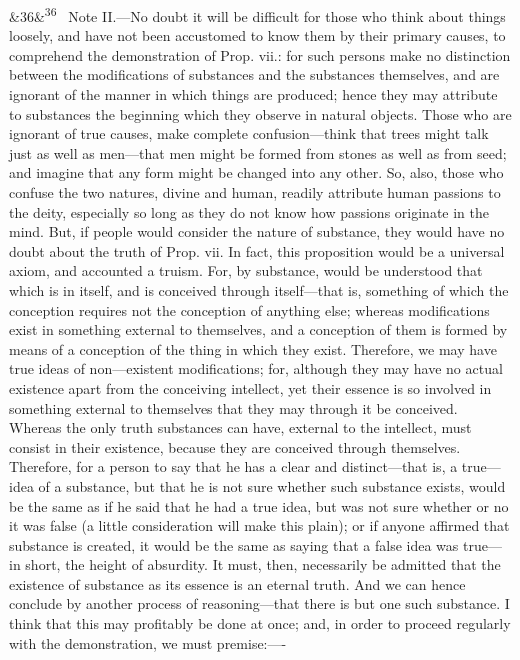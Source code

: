\documentclass[12pt]{article}
\newcommand{\para}[1][]{\par\noindent\ifx&#1&\else\textsuperscript{\footnotesize #1}~\fi}
\begin{document}
\para[36] Note II.---No doubt it will be difficult for those who think about things loosely, and have not been accustomed to know them by their primary causes, to comprehend the demonstration of Prop. vii.: for such persons make no distinction between the modifications of substances and the substances themselves, and are ignorant of the manner in which things are produced; hence they may attribute to substances the beginning which they observe in natural objects. Those who are ignorant of true causes, make complete confusion---think that trees might talk just as well as men---that men might be formed from stones as well as from seed; and imagine that any form might be changed into any other. So, also, those who confuse the two natures, divine and human, readily attribute human passions to the deity, especially so long as they do not know how passions originate in the mind. But, if people would consider the nature of substance, they would have no doubt about the truth of Prop. vii. In fact, this proposition would be a universal axiom, and accounted a truism. For, by substance, would be understood that which is in itself, and is conceived through itself---that is, something of which the conception requires not the conception of anything else; whereas modifications exist in something external to themselves, and a conception of them is formed by means of a conception of the thing in which they exist. Therefore, we may have true ideas of non---existent modifications; for, although they may have no actual existence apart from the conceiving intellect, yet their essence is so involved in something external to themselves that they may through it be conceived. Whereas the only truth substances can have, external to the intellect, must consist in their existence, because they are conceived through themselves. Therefore, for a person to say that he has a clear and distinct---that is, a true---idea of a substance, but that he is not sure whether such substance exists, would be the same as if he said that he had a true idea, but was not sure whether or no it was false (a little consideration will make this plain); or if anyone affirmed that substance is created, it would be the same as saying that a false idea was true---in short, the height of absurdity. It must, then, necessarily be admitted that the existence of substance as its essence is an eternal truth. And we can hence conclude by another process of reasoning---that there is but one such substance. I think that this may profitably be done at once; and, in order to proceed regularly with the demonstration, we must premise:----
\end{document}
